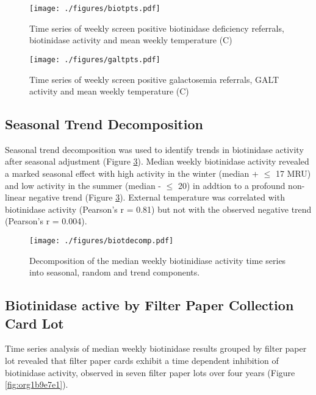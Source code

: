 \documentclass[review]{elsarticle}
\begin{document}
\begin{figure}[htbp]
\centering
\texttt{[image: ./figures/biotpts.pdf]}
\caption{\label{fig:orge7a9de2}Time series of weekly screen positive biotinidase deficiency referrals, biotinidase activity and mean weekly temperature (\degree{}C)}
\end{figure}



\begin{figure}[htbp]
\centering
\texttt{[image: ./figures/galtpts.pdf]}
\caption{\label{fig:org571a718}Time series of weekly screen positive galactosemia referrals, GALT activity and mean weekly temperature (\degree{}C)}
\end{figure}

\clearpage

\subsection*{Seasonal Trend Decomposition}
\label{sec:orgd02bc2b}
Seasonal trend decomposition was used to identify trends in
biotinidase activity after seasonal adjustment (Figure
\ref{fig:org08ac55d}). Median weekly biotinidase activity revealed a marked
seasonal effect with high activity in the winter (median + \(\le\) 17 MRU)
and low activity in the summer (median - \(\le\) 20) in addtion to a
profound non-linear negative trend (Figure \ref{fig:org08ac55d}). External
temperature was correlated with biotinidase activity (Pearson's r =
0.81) but not with the observed negative trend (Pearson's r = 0.004).

\begin{figure}[htbp]
\centering
\texttt{[image: ./figures/biotdecomp.pdf]}
\caption{\label{fig:org08ac55d}Decomposition of the median weekly biotinidiase activity time series into seasonal, random and trend components.}
\end{figure}

\clearpage

\subsection*{Biotinidase active by Filter Paper Collection Card Lot}
\label{sec:org3f50ff7}
Time series analysis of median weekly biotinidase results grouped by
filter paper lot revealed that filter paper cards exhibit a time
dependent inhibition of biotinidase activity, observed in seven
filter paper lots over four years (Figure \ref{fig:org1b9e7e1}).
\end{document}
